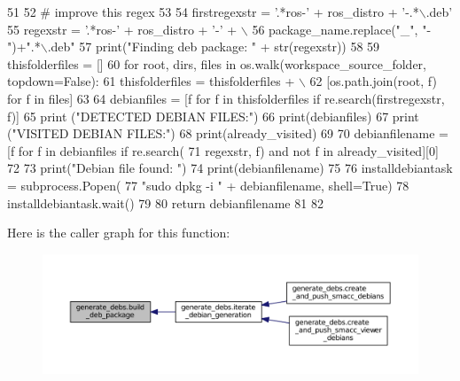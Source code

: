 \begin{DoxyCode}
51 
52     \textcolor{comment}{# improve this regex}
53 
54     firstregexstr = \textcolor{stringliteral}{'.*ros-'} + ros\_distro + \textcolor{stringliteral}{'-.*\(\backslash\).deb'}
55     regexstr = \textcolor{stringliteral}{'.*ros-'} + ros\_distro + \textcolor{stringliteral}{'-'} + \(\backslash\)
56         package\_name.replace(\textcolor{stringliteral}{"\_"}, \textcolor{stringliteral}{"-"})+\textcolor{stringliteral}{".*\(\backslash\).deb"}
57     print(\textcolor{stringliteral}{"Finding deb package: "} + str(regexstr))
58 
59     thisfolderfiles = []
60     \textcolor{keywordflow}{for} root, dirs, files \textcolor{keywordflow}{in} os.walk(workspace\_source\_folder, topdown=\textcolor{keyword}{False}):
61         thisfolderfiles = thisfolderfiles + \(\backslash\)
62             [os.path.join(root, f) \textcolor{keywordflow}{for} f \textcolor{keywordflow}{in} files]
63 
64     debianfiles = [f \textcolor{keywordflow}{for} f \textcolor{keywordflow}{in} thisfolderfiles \textcolor{keywordflow}{if} re.search(firstregexstr, f)]
65     \textcolor{keywordflow}{print} (\textcolor{stringliteral}{"DETECTED DEBIAN FILES:"})
66     print(debianfiles)
67     \textcolor{keywordflow}{print} (\textcolor{stringliteral}{"VISITED DEBIAN FILES:"})
68     print(already\_visited)
69 
70     debianfilename = [f \textcolor{keywordflow}{for} f \textcolor{keywordflow}{in} debianfiles \textcolor{keywordflow}{if} re.search(
71         regexstr, f) \textcolor{keywordflow}{and} \textcolor{keywordflow}{not} f \textcolor{keywordflow}{in} already\_visited][0]
72 
73     print(\textcolor{stringliteral}{"Debian file found: "})
74     print(debianfilename)
75 
76     installdebiantask = subprocess.Popen(
77         \textcolor{stringliteral}{"sudo dpkg -i "} + debianfilename, shell=\textcolor{keyword}{True})
78     installdebiantask.wait()
79 
80     \textcolor{keywordflow}{return} debianfilename
81 
82 
\end{DoxyCode}


Here is the caller graph for this function\+:
\nopagebreak
\begin{figure}[H]
\begin{center}
\leavevmode
\includegraphics[width=350pt]{namespacegenerate__debs_aa70c3f4917ddc57b13eaed8501f571a8_icgraph}
\end{center}
\end{figure}


